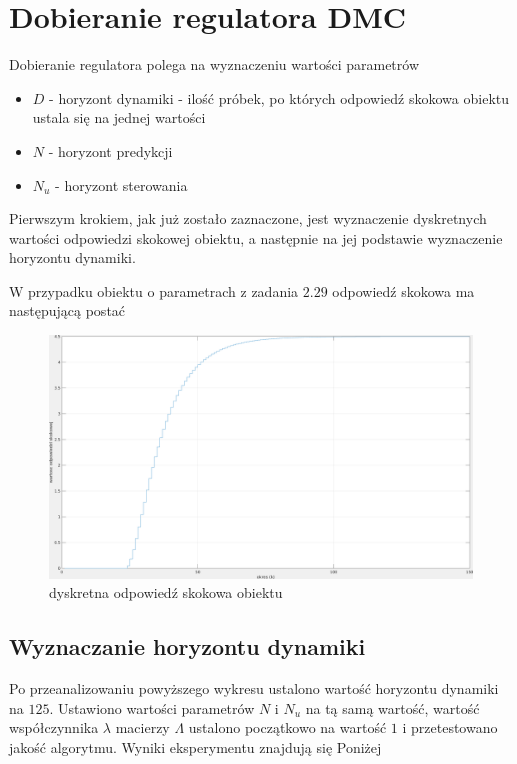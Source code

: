 \documentclass[fleqn]{article}
\begin{document}
\section{Dobieranie regulatora DMC}

Dobieranie regulatora polega na wyznaczeniu wartości parametrów
\begin{itemize}
	\item $D$ - horyzont dynamiki - ilość próbek, po których odpowiedź skokowa obiektu ustala się na jednej wartości
	\item $N$ - horyzont predykcji
	\item $N_u$ - horyzont sterowania
\end{itemize}

Pierwszym krokiem, jak już zostało zaznaczone, jest wyznaczenie dyskretnych wartości odpowiedzi skokowej obiektu, a następnie na jej podstawie wyznaczenie horyzontu dynamiki.

W przypadku obiektu o parametrach z zadania $2.29$ odpowiedź skokowa ma następującą postać

\begin{figure}[H]
	\includegraphics[width=\textwidth]{scripts/odpskokdys.png}
	\caption{dyskretna odpowiedź skokowa obiektu}
\end{figure}

\subsection{Wyznaczanie horyzontu dynamiki}


Po przeanalizowaniu powyższego wykresu ustalono wartość horyzontu dynamiki na $125$. Ustawiono wartości parametrów $N$ i $N_u$ na tą samą wartość, wartość współczynnika $\lambda$ macierzy $\Lambda$ ustalono początkowo na wartość $1$ i przetestowano jakość algorytmu. Wyniki eksperymentu znajdują się Poniżej
\end{document}

